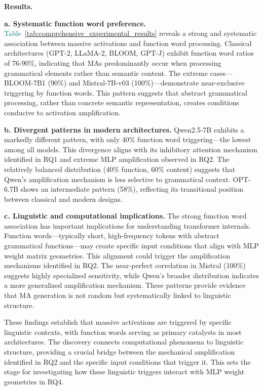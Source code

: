 \documentclass[conference]{IEEEtran}
\begin{document}
\smallskip
\noindent\textbf{Results.}

\smallskip
\noindent\textbf{a. Systematic function word preference.}
\textcolor{teal}{Table~\ref{tab:comprehensive_experimental_results}} reveals a strong and systematic association between massive activations and function word processing. Classical architectures (GPT-2, LLaMA-2, BLOOM, GPT-J) exhibit function word ratios of 76-90\%, indicating that MAs predominantly occur when processing grammatical elements rather than semantic content. The extreme cases—BLOOM-7B1 (90\%) and Mistral-7B-v03 (100\%)—demonstrate near-exclusive triggering by function words. This pattern suggests that abstract grammatical processing, rather than concrete semantic representation, creates conditions conducive to activation amplification.

\smallskip
\noindent\textbf{b. Divergent patterns in modern architectures.}
Qwen2.5-7B exhibits a markedly different pattern, with only 40\% function word triggering—the lowest among all models. This divergence aligns with its inhibitory attention mechanism identified in RQ1 and extreme MLP amplification observed in RQ2. The relatively balanced distribution (40\% function, 60\% content) suggests that Qwen's amplification mechanism is less selective to grammatical context. OPT-6.7B shows an intermediate pattern (58\%), reflecting its transitional position between classical and modern designs.

\smallskip
\noindent\textbf{c. Linguistic and computational implications.}
The strong function word association has important implications for understanding transformer internals. Function words—typically short, high-frequency tokens with abstract grammatical functions—may create specific input conditions that align with MLP weight matrix geometries. This alignment could trigger the amplification mechanisms identified in RQ2. The near-perfect correlation in Mistral (100\%) suggests highly specialized sensitivity, while Qwen's broader distribution indicates a more generalized amplification mechanism. These patterns provide evidence that MA generation is not random but systematically linked to linguistic structure.

These findings establish that massive activations are triggered by specific linguistic contexts, with function words serving as primary catalysts in most architectures. The discovery connects computational phenomena to linguistic structure, providing a crucial bridge between the mechanical amplification identified in RQ2 and the specific input conditions that trigger it. This sets the stage for investigating how these linguistic triggers interact with MLP weight geometries in RQ4.
\end{document}
